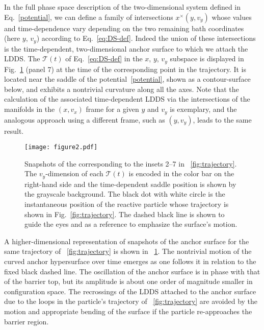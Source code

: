 \documentclass{elsarticle}
\def\EDITS#1{{\color{green}#1}}
\def\EDITS#1{#1}
\def\EDITS#1{{\color{mygreen}#1}}
\begin{document}
In the full phase space description of the two-dimensional system 
defined in Eq.~\eqref{potential}, we
can define a family of intersections $x^\times(y,v_y)$ whose
values and time-dependence vary
depending on the two remaining bath coordinates (here $y$, $v_y$)
according to Eq.~\eqref{eq:DS-def}. 
Indeed the union of these intersections
is the time-dependent, two-dimensional 
\EDITS{anchor surface to which we attach the}
LDDS. 
The 
\EDITS{$\mathcal{T}(t)$}
of Eq.~\eqref{eq:DS-def} in the $x$, $y$, $v_y$ subspace 
is displayed in Fig.~\ref{fig:several_surfaces} (panel 7) 
at the time of the corresponding point in the trajectory.
It is located near the saddle of the 
potential~\eqref{potential}, shown as a contour-surface below,
and 
exhibits a nontrivial curvature along all the axes.
% 
Note that the calculation of the 
\EDITS{associated}
time-dependent LDDS via the intersections of the manifolds
in the $(x,v_x)$ frame for a given $y$ and $v_y$ is exemplary,
and the analogous approach using a different frame,
such as $(y,v_y)$, leads to the same result.


\begin{figure}[t]
\texttt{[image: figure2.pdf]}
\caption{%
Snapshots of the 
corresponding to the insets 2--7 in 
\FIG~\ref{fig:trajectory}.
The $v_y$-dimension of each 
\EDITS{$\mathcal{T}(t)$}
is encoded in the color bar on the 
right-hand side and the time-dependent saddle position is shown by the 
grayscale background.
The black dot with white circle is the instantaneous position of the reactive 
particle whose trajectory is shown in Fig.~\ref{fig:trajectory}.
The dashed black line is shown to guide the eyes and as a reference to 
emphasize the surface's motion.
}
\label{fig:several_surfaces}
\end{figure}

A higher-dimensional representation of snapshots of the 
\EDITS{anchor surface}
for the same trajectory of \FIG~\ref{fig:trajectory} is 
shown in \FIG~\ref{fig:several_surfaces}.
The nontrivial motion of the 
curved 
\EDITS{anchor}
hypersurface over time emerges as one
follows it in relation to the fixed black dashed line.
The oscillation of the 
\EDITS{anchor surface}
is in phase with that of the barrier top, 
but its amplitude is about one order of magnitude smaller 
in configuration space.
The recrossings of the
LDDS
\EDITS{attached to the anchor surface}
due to the loops in the particle's trajectory 
of \FIG~\ref{fig:trajectory} are avoided by the motion and appropriate bending
of the surface if the particle re-approaches the barrier region.
\end{document}
